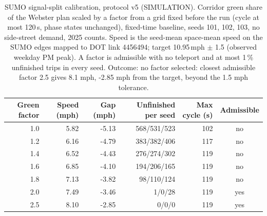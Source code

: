 \begin{table}[t]\centering\caption{SUMO signal-split calibration, protocol v5 (SIMULATION). Corridor green share of the Webster plan scaled by a factor from a grid fixed before the run (cycle at most 120\,s, phase states unchanged), fixed-time baseline, seeds 101, 102, 103, no side-street demand, 2025 counts. Speed is the seed-mean space-mean speed on the SUMO edges mapped to DOT link 4456494; target 10.95\,mph $\pm$ 1.5 (observed weekday PM peak). A factor is admissible with no teleport and at most 1\,\% unfinished trips in every seed. Outcome: no factor selected: closest admissible factor 2.5 gives 8.1 mph, -2.85 mph from the target, beyond the 1.5 mph tolerance.}\label{tab:splitcal}\small
\begin{tabular}{rrrrrc}\toprule Green factor & Speed (mph) & Gap (mph) & Unfinished per seed & Max cycle (s) & Admissible \\ \midrule
1.0 & 5.82 & -5.13 & 568/531/523 & 102 & no \\
1.2 & 6.16 & -4.79 & 383/382/406 & 117 & no \\
1.4 & 6.52 & -4.43 & 276/274/302 & 119 & no \\
1.6 & 6.85 & -4.10 & 194/206/165 & 119 & no \\
1.8 & 7.13 & -3.82 & 98/110/124 & 119 & no \\
2.0 & 7.49 & -3.46 & 1/0/28 & 119 & yes \\
2.5 & 8.10 & -2.85 & 0/0/0 & 119 & yes \\
\bottomrule\end{tabular}\end{table}
